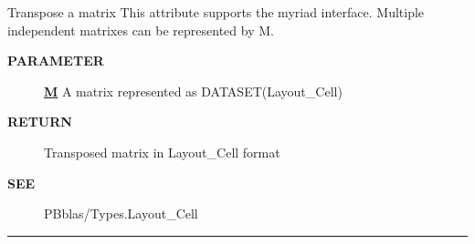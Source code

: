 \par
Transpose a matrix This attribute supports the myriad interface. Multiple independent matrixes can be represented by M.

\par
\begin{description}
\item [\colorbox{tagtype}{\color{white} \textbf{\textsf{PARAMETER}}}] \textbf{\underline{M}} A matrix represented as DATASET(Layout\_Cell)
\item [\colorbox{tagtype}{\color{white} \textbf{\textsf{RETURN}}}] \textbf{\underline{}} Transposed matrix in Layout\_Cell format
\item [\colorbox{tagtype}{\color{white} \textbf{\textsf{SEE}}}] \textbf{\underline{}} PBblas/Types.Layout\_Cell
\end{description}

\rule{\linewidth}{0.5pt}


